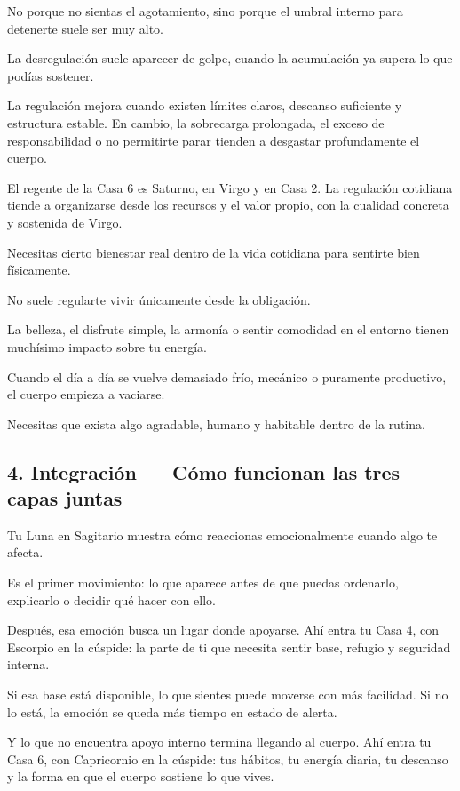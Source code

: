 \documentclass[11pt,a4paper]{article}
\begin{document}
No porque no sientas el agotamiento, sino porque el umbral interno para detenerte suele ser muy alto.

La desregulación suele aparecer de golpe, cuando la acumulación ya supera lo que podías sostener.

La regulación mejora cuando existen límites claros, descanso suficiente y estructura estable. En cambio, la sobrecarga prolongada, el exceso de responsabilidad o no permitirte parar tienden a desgastar profundamente el cuerpo.

El regente de la Casa 6 es Saturno, en Virgo y en Casa 2. La regulación cotidiana tiende a organizarse desde los recursos y el valor propio, con la cualidad concreta y sostenida de Virgo.

Necesitas cierto bienestar real dentro de la vida cotidiana para sentirte bien físicamente.

No suele regularte vivir únicamente desde la obligación.

La belleza, el disfrute simple, la armonía o sentir comodidad en el entorno tienen muchísimo impacto sobre tu energía.

Cuando el día a día se vuelve demasiado frío, mecánico o puramente productivo, el cuerpo empieza a vaciarse.

Necesitas que exista algo agradable, humano y habitable dentro de la rutina.

\subsection{4. Integración — Cómo funcionan las tres capas juntas}

Tu Luna en Sagitario muestra cómo reaccionas emocionalmente cuando algo te afecta.

Es el primer movimiento: lo que aparece antes de que puedas ordenarlo, explicarlo o decidir qué hacer con ello.

Después, esa emoción busca un lugar donde apoyarse. Ahí entra tu Casa 4, con Escorpio en la cúspide: la parte de ti que necesita sentir base, refugio y seguridad interna.

Si esa base está disponible, lo que sientes puede moverse con más facilidad.
Si no lo está, la emoción se queda más tiempo en estado de alerta.

Y lo que no encuentra apoyo interno termina llegando al cuerpo. Ahí entra tu Casa 6, con Capricornio en la cúspide: tus hábitos, tu energía diaria, tu descanso y la forma en que el cuerpo sostiene lo que vives.
\end{document}
